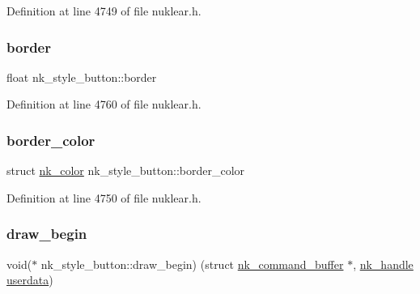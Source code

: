 Definition at line 4749 of file nuklear.\+h.

\mbox{\label{structnk__style__button_a1f6e003617c76e6d7012ad4a64671303}} 
\subsubsection{\texorpdfstring{border}{border}}
{\footnotesize\ttfamily float nk\+\_\+style\+\_\+button\+::border}



Definition at line 4760 of file nuklear.\+h.

\mbox{\label{structnk__style__button_aa89ff1863884006ea538cf4f5be8780a}} 
\subsubsection{\texorpdfstring{border\+\_\+color}{border\_color}}
{\footnotesize\ttfamily struct \mbox{\hyperlink{structnk__color}{nk\+\_\+color}} nk\+\_\+style\+\_\+button\+::border\+\_\+color}



Definition at line 4750 of file nuklear.\+h.

\mbox{\label{structnk__style__button_a802641ef81a16f9d78c4a6758a3109b6}} 
\subsubsection{\texorpdfstring{draw\+\_\+begin}{draw\_begin}}
{\footnotesize\ttfamily void($\ast$ nk\+\_\+style\+\_\+button\+::draw\+\_\+begin) (struct \mbox{\hyperlink{structnk__command__buffer}{nk\+\_\+command\+\_\+buffer}} $\ast$, \mbox{\hyperlink{unionnk__handle}{nk\+\_\+handle}} \mbox{\hyperlink{structnk__style__button_a486c8383bd02dae018cacaa370bf0c43}{userdata}})}



